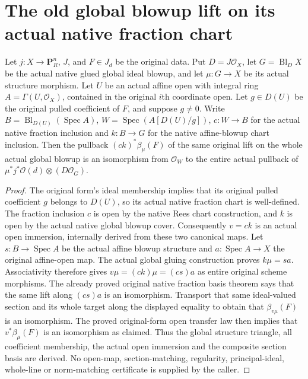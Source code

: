 \section{The old global blowup lift on its actual native fraction chart}
\begin{proposition}
\label{prop:whole-original-global-blowup-fraction-basis}
\leanok
Let $j:X\to\mathbf P_R^n$, $J$, and $F\in J_d$ be the original data. Put
$D=J\mathcal O_X$, let $G=\operatorname{Bl}_D X$ be the actual native glued
global ideal blowup, and let $\mu:G\to X$ be its actual structure morphism.
Let $U$ be an actual affine open with integral ring $A=\Gamma(U,\mathcal O_X)$,
contained in the original $i$th coordinate open. Let $g\in D(U)$ be the
original pulled coefficient of $F$, and suppose $g\ne0$. Write
$B=\operatorname{Bl}_{D(U)}(\operatorname{Spec}A)$,
$W=\operatorname{Spec}(A[D(U)/g])$, $c:W\to B$ for the actual native
fraction inclusion and $k:B\to G$ for the native affine-blowup chart inclusion.
Then the pullback $(ck)^*\beta_\mu(F)$ of the same original lift on the whole
actual global blowup is an isomorphism from $\mathcal O_W$ to the entire
actual pullback of $\mu^*j^*\mathcal O(d)\otimes(D\mathcal O_G)$.
\end{proposition}
\begin{proof}
The original form's ideal membership implies that its original pulled
coefficient $g$ belongs to $D(U)$, so its actual native fraction chart is
well-defined. The fraction inclusion $c$ is open by the native Rees chart
construction, and $k$ is open by the actual native global blowup cover.
Consequently $v=ck$ is an actual open immersion, internally derived from
these two canonical maps.
Let $s:B\to\operatorname{Spec}A$ be the actual affine blowup structure and
$a:\operatorname{Spec}A\to X$ the original affine-open map. The actual global
gluing construction proves $k\mu=sa$. Associativity therefore gives
$v\mu=(ck)\mu=(cs)a$ as entire original scheme morphisms.
The already proved original native fraction basis theorem says that the same
lift along $(cs)a$ is an isomorphism. Transport that same ideal-valued section
and its whole target along the displayed equality to obtain that
$\beta_{v\mu}(F)$ is an isomorphism. The proved original-form open transfer
law then implies that $v^*\beta_\mu(F)$ is an isomorphism as claimed.
Thus the global structure triangle, all coefficient membership, the actual
open immersion and the composite section basis are derived. No open-map,
section-matching, regularity, principal-ideal, whole-line or norm-matching
certificate is supplied by the caller.
\end{proof}
